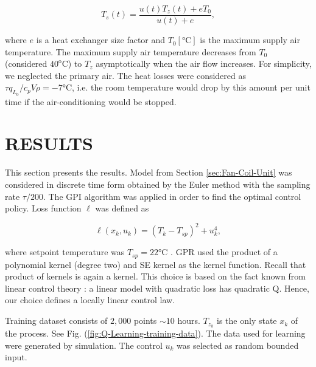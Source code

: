 \documentclass{ifacconf}
\begin{document}
\begin{equation}
T_{s}(t)=\frac{u(t)T_{z}(t)+eT_{0}}{u(t)+e},\label{eq:supply-air-temperature}
\end{equation}

\noindent where $e$ is a heat exchanger size factor and $T_{0}\left[\mathrm{\si{\celsius}}\right]$
is the maximum supply air temperature. The maximum supply air temperature
decreases from $T_{0}$ (considered $\mathrm{40^{o}C}$) to $T_{z}$
asymptotically when the air flow increases. For simplicity, we neglected
the primary air. The heat losses were considered as $\tau q_{L_{0}}/c_{p}V\rho=-7\mathrm{\si{\celsius}}$,
i.e. the room temperature would drop by this amount per unit time
if the air-conditioning would be stopped.

\section{RESULTS}\label{sec:RESULTS}

This section presents the results. Model from Section \ref{sec:Fan-Coil-Unit}
was considered in discrete time form obtained by the Euler method
with the sampling rate $\tau/200$. The GPI algorithm was applied
in order to find the optimal control policy. Loss function $\ell$
was defined as

\begin{equation}
\ell(x_{k},u_{k})=(T_{k}-T_{sp})^{2}+u_{k}^{4},\label{eq:loss-calculation}
\end{equation}

\noindent where setpoint temperature was $T_{sp}=22\unit{\si{\celsius}}$
. GPR used the product of a polynomial kernel (degree two) and SE
kernel as the kernel function. Recall that product of kernels is again
a kernel. This choice is based on the fact known from linear control
theory \citep{ecc19ref:Kwakernaak_linear_optimal_control_systems}:
a linear model with quadratic loss has quadratic Q. Hence, our choice
defines a locally linear control law.

Training dataset consists of $2,000$ points $\sim10$ hours. $T_{z_{k}}$
is the only state $x_{k}$ of the process. See Fig. (\ref{fig:Q-Learning-training-data}).
The data used for learning were generated by simulation. The control
$u_{k}$ was selected as random bounded input. 
\end{document}
